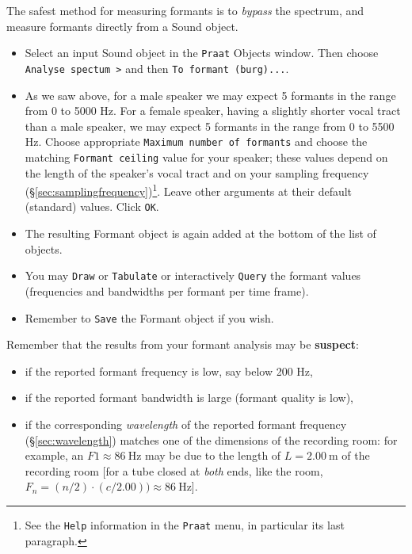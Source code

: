 \documentclass[
]{book}
\begin{document}
The safest method for measuring formants is to \emph{bypass} the spectrum, and measure formants directly from a Sound object.

\begin{itemize}
\item
  Select an input Sound object in the \texttt{Praat} Objects window. Then choose \texttt{Analyse\ spectum\ \textgreater{}} and then \texttt{To\ formant\ (burg)...}.
\item
  As we saw above, for a male speaker we may expect 5 formants in the range from 0 to 5000 Hz. For a female speaker, having a slightly shorter vocal tract than a male speaker, we may expect 5 formants in the range from 0 to 5500 Hz. Choose appropriate \texttt{Maximum\ number\ of\ formants} and choose the matching \texttt{Formant\ ceiling} value for your speaker; these values depend on the length of the speaker's vocal tract and on your sampling frequency (§\ref{sec:samplingfrequency})\footnote{See the \texttt{Help} information in the \texttt{Praat} menu, in particular its last paragraph.}.
  Leave other arguments at their default (standard) values. Click \texttt{OK}.
\item
  The resulting Formant object is again added at the bottom of the list of objects.
\item
  You may \texttt{Draw} or \texttt{Tabulate} or interactively \texttt{Query} the formant values (frequencies and bandwidths per formant per time frame).
\item
  Remember to \texttt{Save} the Formant object if you wish.
\end{itemize}

\label{box:formantanalysis}
Remember that the results from your formant analysis may be \textbf{suspect}:

\begin{itemize}
\item
  if the reported formant frequency is low, say below 200 Hz,
\item
  if the reported formant bandwidth is large (formant quality is low),
\item
  if the corresponding \emph{wavelength} of the reported formant frequency (§\ref{sec:wavelength}) matches one of the dimensions of the recording room: for example, an \(F1 \approx 86\ \textrm{Hz}\) may be due to the length of \(L=2.00\ \textrm{m}\) of the recording room {[}for a tube closed at \emph{both} ends, like the room, \(F_n=(n/2)\cdot(c/2.00)) \approx 86\ \textrm{Hz}\){]}.
\end{itemize}
\end{document}
